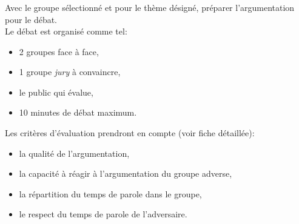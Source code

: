 \documentclass[svgnames,11pt]{beamer}
\begin{document}
\begin{frame}
    \frametitle{}

    \begin{activite}
    Avec le groupe sélectionné et pour le thème désigné, préparer l'argumentation pour le débat.\\
    Le débat est organisé comme tel:
    \begin{itemize}
        \item 2 groupes face à face,
        \item 1 groupe \emph{jury} à convaincre,
        \item le public qui évalue,
        \item 10 minutes de débat maximum.
    \end{itemize}
    Les critères d'évaluation prendront en compte (voir fiche détaillée):
    \begin{itemize}
        \item la qualité de l'argumentation,
        \item la capacité à réagir à l'argumentation du groupe adverse,
        \item la répartition du temps de parole dans le groupe,
        \item le respect du temps de parole de l'adversaire.
    \end{itemize}
    \end{activite}

\end{frame}
\end{document}

